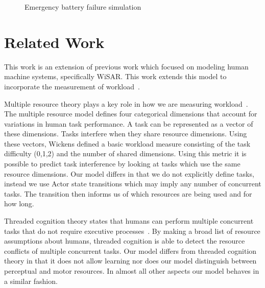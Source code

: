 \begin{figure}[h]
\center
\setlength{\abovecaptionskip}{1mm}
\setlength{\belowcaptionskip}{1mm}
\setlength{\textfloatsep}{1mm}
\setlength{\floatsep}{1mm}
\caption{Emergency battery failure simulation}
\label{fig:WorkloadSim2}
\end{figure}

\section{Related Work}

This work is an extension of previous work which focused on modeling human
machine systems, specifically WiSAR.  This work extends this model to
incorporate the measurement of workload~\cite{gledhill2013modelinguas}.

Multiple resource theory plays a key role in how we are measuring workload~\cite{wickens2002multiple}. The multiple resource model defines four categorical dimensions that
account for variations in human task performance.  A task can be represented as a vector of these dimensions.  Tasks interfere when they share resource dimensions.  Using these vectors, Wickens defined a basic workload measure consisting of the task difficulty (0,1,2) and the number of shared dimensions.  Using this metric it is possible to predict task interference by looking at tasks which use the same resource dimensions.  Our model differs in that we do not explicitly define tasks, instead we use Actor state transitions which may imply any number of concurrent tasks.  The transition then informs us of which resources are being used and for how long.  

Threaded cognition theory states that humans can perform
multiple concurrent tasks that do not require executive processes~\cite{salvucci2008threaded}.  By making a
broad list of resource assumptions about humans, threaded cognition is able to
detect the resource conflicts of multiple concurrent tasks.  Our model differs from
threaded cognition theory in that it does not allow learning nor does our model distinguish
between perceptual and motor resources. In almost all other aspects our model behaves in a similar fashion.

